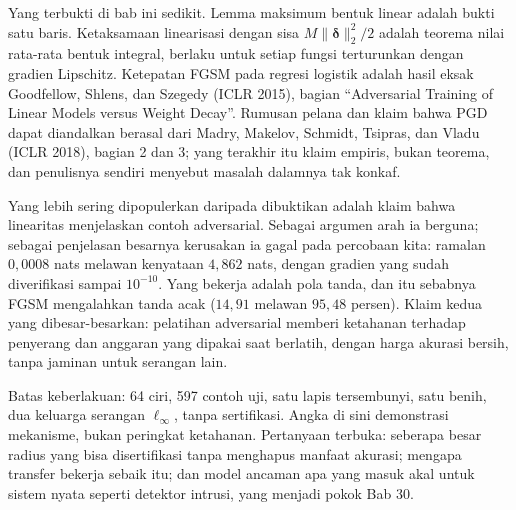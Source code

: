 \begin{untukpeneliti}
Yang terbukti di bab ini sedikit. Lemma maksimum bentuk linear adalah bukti satu baris.
Ketaksamaan linearisasi dengan sisa $M\lVert\boldsymbol{\delta}\rVert_2^2/2$ adalah
teorema nilai rata-rata bentuk integral, berlaku untuk setiap fungsi terturunkan dengan
gradien Lipschitz. Ketepatan FGSM pada regresi logistik adalah hasil eksak Goodfellow,
Shlens, dan Szegedy (ICLR 2015), bagian ``Adversarial Training of Linear Models versus
Weight Decay''. Rumusan pelana dan klaim bahwa PGD dapat diandalkan berasal dari Madry,
Makelov, Schmidt, Tsipras, dan Vladu (ICLR 2018), bagian 2 dan 3; yang terakhir itu
klaim empiris, bukan teorema, dan penulisnya sendiri menyebut masalah dalamnya tak
konkaf.

Yang lebih sering dipopulerkan daripada dibuktikan adalah klaim bahwa linearitas
menjelaskan contoh adversarial. Sebagai argumen arah ia berguna; sebagai penjelasan
besarnya kerusakan ia gagal pada percobaan kita: ramalan $0{,}0008$ nats melawan
kenyataan $4{,}862$ nats, dengan gradien yang sudah diverifikasi sampai $10^{-10}$.
Yang bekerja adalah pola tanda, dan itu sebabnya FGSM mengalahkan tanda acak
($14{,}91$ melawan $95{,}48$ persen). Klaim kedua yang dibesar-besarkan: pelatihan
adversarial memberi ketahanan terhadap penyerang dan anggaran yang dipakai saat
berlatih, dengan harga akurasi bersih, tanpa jaminan untuk serangan lain.

Batas keberlakuan: 64 ciri, 597 contoh uji, satu lapis tersembunyi, satu benih, dua
keluarga serangan $\ell_\infty$, tanpa sertifikasi. Angka di sini demonstrasi mekanisme,
bukan peringkat ketahanan. Pertanyaan terbuka: seberapa besar radius yang bisa
disertifikasi tanpa menghapus manfaat akurasi; mengapa transfer bekerja sebaik itu;
dan model ancaman apa yang masuk akal untuk sistem nyata seperti detektor intrusi, yang
menjadi pokok Bab 30.
\end{untukpeneliti}


